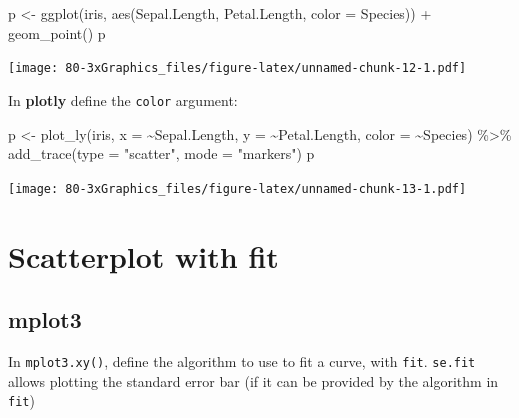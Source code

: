 \documentclass[
]{book}
\newenvironment{Shaded}{\begin{snugshade}}{\end{snugshade}}
\newcommand{\AttributeTok}[1]{\textcolor[rgb]{0.77,0.63,0.00}{#1}}
\newcommand{\FunctionTok}[1]{\textcolor[rgb]{0.00,0.00,0.00}{#1}}
\newcommand{\NormalTok}[1]{#1}
\newcommand{\OtherTok}[1]{\textcolor[rgb]{0.56,0.35,0.01}{#1}}
\newcommand{\SpecialCharTok}[1]{\textcolor[rgb]{0.00,0.00,0.00}{#1}}
\newcommand{\StringTok}[1]{\textcolor[rgb]{0.31,0.60,0.02}{#1}}
\begin{document}
\begin{Shaded}
\begin{Highlighting}[]
\NormalTok{p }\OtherTok{\textless{}{-}} \FunctionTok{ggplot}\NormalTok{(iris, }\FunctionTok{aes}\NormalTok{(Sepal.Length, Petal.Length, }\AttributeTok{color =}\NormalTok{ Species)) }\SpecialCharTok{+}
  \FunctionTok{geom\_point}\NormalTok{()}
\NormalTok{p}
\end{Highlighting}
\end{Shaded}

\texttt{[image: 80-3xGraphics\_files/figure-latex/unnamed-chunk-12-1.pdf]}

In \textbf{plotly} define the \texttt{color} argument:

\begin{Shaded}
\begin{Highlighting}[]
\NormalTok{p }\OtherTok{\textless{}{-}} \FunctionTok{plot\_ly}\NormalTok{(iris, }\AttributeTok{x =} \SpecialCharTok{\textasciitilde{}}\NormalTok{Sepal.Length, }\AttributeTok{y =} \SpecialCharTok{\textasciitilde{}}\NormalTok{Petal.Length, }\AttributeTok{color =} \SpecialCharTok{\textasciitilde{}}\NormalTok{Species) }\SpecialCharTok{\%\textgreater{}\%} 
  \FunctionTok{add\_trace}\NormalTok{(}\AttributeTok{type =} \StringTok{"scatter"}\NormalTok{, }\AttributeTok{mode =} \StringTok{"markers"}\NormalTok{)}
\NormalTok{p}
\end{Highlighting}
\end{Shaded}

\texttt{[image: 80-3xGraphics\_files/figure-latex/unnamed-chunk-13-1.pdf]}

\hypertarget{scatterplot-with-fit}{%
\section{Scatterplot with fit}\label{scatterplot-with-fit}}

\hypertarget{mplot3-1}{%
\subsection{\texorpdfstring{\textbf{mplot3}}{mplot3}}\label{mplot3-1}}

In \texttt{mplot3.xy()}, define the algorithm to use to fit a curve, with \texttt{fit}. \texttt{se.fit} allows plotting the standard error bar (if it can be provided by the algorithm in \texttt{fit})

\begin{Shaded}
\end{Shaded}
\end{document}
